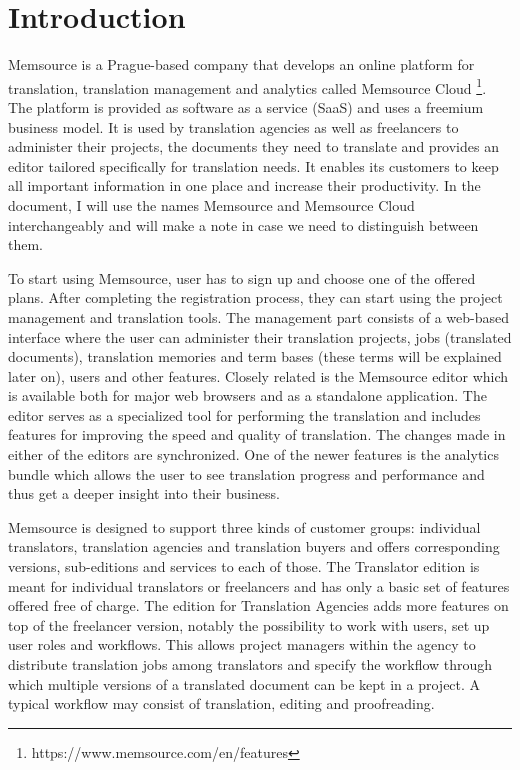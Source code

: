 
\chapter{Introduction}


Memsource is a Prague-based company that develops an online platform for translation, translation management and analytics called Memsource Cloud \footnote{https://www.memsource.com/en/features}. The platform is provided as software as a service (SaaS) and uses a freemium business model. It is used by translation agencies as well as freelancers to administer their projects, the documents they need to translate and provides an editor tailored specifically for translation needs. It enables its customers to keep all important information in one place and increase their productivity. In the document, I will use the names Memsource and Memsource Cloud interchangeably and will make a note in case we need to distinguish between them.

To start using Memsource, user has to sign up and choose one of the offered plans. After completing the registration process, they can start using the project management and translation tools. The management part consists of a web-based interface where the user can administer their translation projects, jobs (translated documents), translation memories and term bases (these terms will be explained later on), users and other features. Closely related is the Memsource editor which is available both for major web browsers and as a standalone application. The editor serves as a specialized tool for performing the translation and includes features for improving the speed and quality of translation. The changes made in either of the editors are synchronized. One of the newer features is the analytics bundle which allows the user to see translation progress and performance and thus get a deeper insight into their business.

Memsource is designed to support three kinds of customer groups: individual translators, translation agencies and translation buyers and offers corresponding versions, sub-editions and services to each of those.
The Translator edition is meant for individual translators or freelancers and has only a basic set of features offered free of charge. The edition for Translation Agencies adds more features on top of the freelancer version, notably the possibility to work with users, set up user roles and workflows. This allows project managers within the agency to distribute translation jobs among translators and specify the workflow through which multiple versions of a translated document can be kept in a project. A typical workflow may consist of translation, editing and proofreading.

